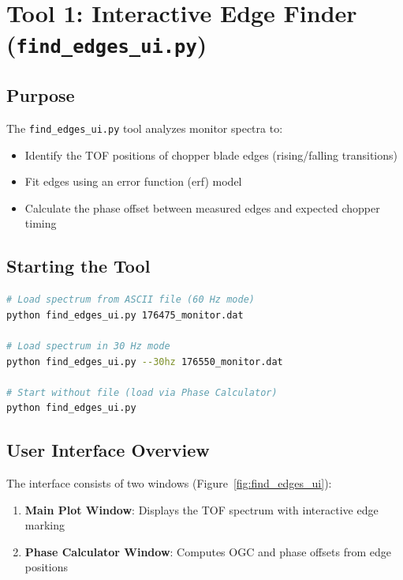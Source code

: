 \documentclass[11pt,letterpaper]{article}
\begin{document}
\section{Tool 1: Interactive Edge Finder (\texttt{find\_edges\_ui.py})}

\subsection{Purpose}

The \texttt{find\_edges\_ui.py} tool analyzes monitor spectra to:
\begin{itemize}
    \item Identify the TOF positions of chopper blade edges (rising/falling transitions)
    \item Fit edges using an error function (erf) model
    \item Calculate the phase offset between measured edges and expected chopper timing
\end{itemize}

\subsection{Starting the Tool}

\begin{lstlisting}[language=bash]
# Load spectrum from ASCII file (60 Hz mode)
python find_edges_ui.py 176475_monitor.dat

# Load spectrum in 30 Hz mode
python find_edges_ui.py --30hz 176550_monitor.dat

# Start without file (load via Phase Calculator)
python find_edges_ui.py
\end{lstlisting}

\subsection{User Interface Overview}

The interface consists of two windows (Figure~\ref{fig:find_edges_ui}):
\begin{enumerate}
    \item \textbf{Main Plot Window}: Displays the TOF spectrum with interactive edge marking
    \item \textbf{Phase Calculator Window}: Computes OGC and phase offsets from edge positions
\end{enumerate}
\end{document}
